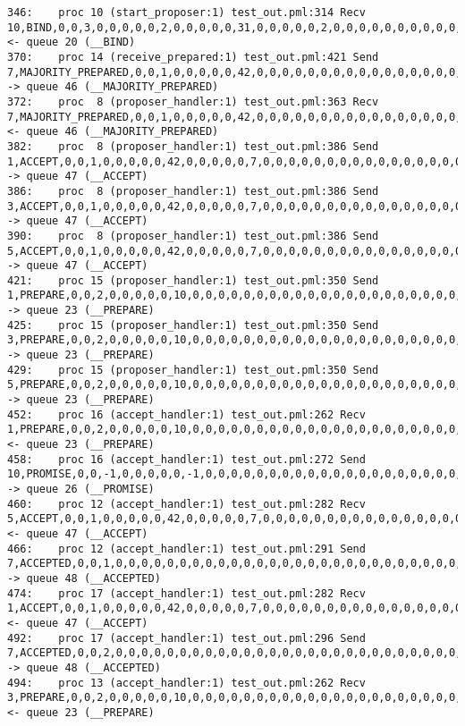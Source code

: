 \begin{lstlisting}[xleftmargin=.01\linewidth, xrightmargin=0.01\linewidth, caption={Message passing caused by the proposer's protocol bug.}, label={lst:paxos_bug}]
346:    proc 10 (start_proposer:1) test_out.pml:314 Recv 10,BIND,0,0,3,0,0,0,0,0,2,0,0,0,0,0,31,0,0,0,0,0,2,0,0,0,0,0,0,0,0,0,0,0,0,0,0,0       <- queue 20 (__BIND)
370:    proc 14 (receive_prepared:1) test_out.pml:421 Send 7,MAJORITY_PREPARED,0,0,1,0,0,0,0,0,42,0,0,0,0,0,0,0,0,0,0,0,0,0,0,0,0,0,0,0,0,0,0,0,0,0,0,0 -> queue 46 (__MAJORITY_PREPARED)
372:    proc  8 (proposer_handler:1) test_out.pml:363 Recv 7,MAJORITY_PREPARED,0,0,1,0,0,0,0,0,42,0,0,0,0,0,0,0,0,0,0,0,0,0,0,0,0,0,0,0,0,0,0,0,0,0,0,0 <- queue 46 (__MAJORITY_PREPARED)
382:    proc  8 (proposer_handler:1) test_out.pml:386 Send 1,ACCEPT,0,0,1,0,0,0,0,0,42,0,0,0,0,0,7,0,0,0,0,0,0,0,0,0,0,0,0,0,0,0,0,0,0,0,0,0    -> queue 47 (__ACCEPT)
386:    proc  8 (proposer_handler:1) test_out.pml:386 Send 3,ACCEPT,0,0,1,0,0,0,0,0,42,0,0,0,0,0,7,0,0,0,0,0,0,0,0,0,0,0,0,0,0,0,0,0,0,0,0,0    -> queue 47 (__ACCEPT)
390:    proc  8 (proposer_handler:1) test_out.pml:386 Send 5,ACCEPT,0,0,1,0,0,0,0,0,42,0,0,0,0,0,7,0,0,0,0,0,0,0,0,0,0,0,0,0,0,0,0,0,0,0,0,0    -> queue 47 (__ACCEPT)
421:    proc 15 (proposer_handler:1) test_out.pml:350 Send 1,PREPARE,0,0,2,0,0,0,0,0,10,0,0,0,0,0,0,0,0,0,0,0,0,0,0,0,0,0,0,0,0,0,0,0,0,0,0,0   -> queue 23 (__PREPARE)
425:    proc 15 (proposer_handler:1) test_out.pml:350 Send 3,PREPARE,0,0,2,0,0,0,0,0,10,0,0,0,0,0,0,0,0,0,0,0,0,0,0,0,0,0,0,0,0,0,0,0,0,0,0,0   -> queue 23 (__PREPARE)
429:    proc 15 (proposer_handler:1) test_out.pml:350 Send 5,PREPARE,0,0,2,0,0,0,0,0,10,0,0,0,0,0,0,0,0,0,0,0,0,0,0,0,0,0,0,0,0,0,0,0,0,0,0,0   -> queue 23 (__PREPARE)
452:    proc 16 (accept_handler:1) test_out.pml:262 Recv 1,PREPARE,0,0,2,0,0,0,0,0,10,0,0,0,0,0,0,0,0,0,0,0,0,0,0,0,0,0,0,0,0,0,0,0,0,0,0,0     <- queue 23 (__PREPARE)
458:    proc 16 (accept_handler:1) test_out.pml:272 Send 10,PROMISE,0,0,-1,0,0,0,0,0,-1,0,0,0,0,0,0,0,0,0,0,0,0,0,0,0,0,0,0,0,0,0,0,0,0,0,0,0   -> queue 26 (__PROMISE)
460:    proc 12 (accept_handler:1) test_out.pml:282 Recv 5,ACCEPT,0,0,1,0,0,0,0,0,42,0,0,0,0,0,7,0,0,0,0,0,0,0,0,0,0,0,0,0,0,0,0,0,0,0,0,0      <- queue 47 (__ACCEPT)
466:    proc 12 (accept_handler:1) test_out.pml:291 Send 7,ACCEPTED,0,0,1,0,0,0,0,0,0,0,0,0,0,0,0,0,0,0,0,0,0,0,0,0,0,0,0,0,0,0,0,0,0,0,0,0     -> queue 48 (__ACCEPTED)
474:    proc 17 (accept_handler:1) test_out.pml:282 Recv 1,ACCEPT,0,0,1,0,0,0,0,0,42,0,0,0,0,0,7,0,0,0,0,0,0,0,0,0,0,0,0,0,0,0,0,0,0,0,0,0      <- queue 47 (__ACCEPT)
492:    proc 17 (accept_handler:1) test_out.pml:296 Send 7,ACCEPTED,0,0,2,0,0,0,0,0,0,0,0,0,0,0,0,0,0,0,0,0,0,0,0,0,0,0,0,0,0,0,0,0,0,0,0,0     -> queue 48 (__ACCEPTED)
494:    proc 13 (accept_handler:1) test_out.pml:262 Recv 3,PREPARE,0,0,2,0,0,0,0,0,10,0,0,0,0,0,0,0,0,0,0,0,0,0,0,0,0,0,0,0,0,0,0,0,0,0,0,0     <- queue 23 (__PREPARE)

\end{lstlisting}
